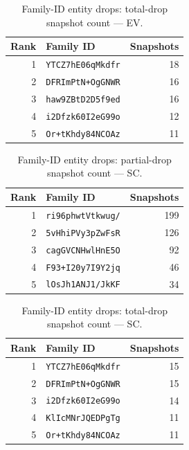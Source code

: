\documentclass[conference]{IEEEtran}
\begin{document}
\begin{table}[H]
\caption{Family-ID entity drops: total-drop snapshot count --- EV.}
\begin{center}\small
\begin{tabular}{|r|l|r|}
\hline
\textbf{Rank} & \textbf{Family ID} & \textbf{Snapshots} \\ \hline
1 & \texttt{YTCZ7hE06qMkdfr} & 18 \\ \hline
2 & \texttt{DFRImPtN+OgGNWR} & 16 \\ \hline
3 & \texttt{haw9ZBtD2D5f9ed} & 16 \\ \hline
4 & \texttt{i2Dfzk60I2eG99o} & 12 \\ \hline
5 & \texttt{Or+tKhdy84NCOAz} & 11 \\ \hline
\end{tabular}
\label{tab:famdrop_total_ephemeral_variable}
\end{center}\end{table}
 
\begin{table}[H]
\caption{Family-ID entity drops: partial-drop snapshot count --- SC.}
\begin{center}\small
\begin{tabular}{|r|l|r|}
\hline
\textbf{Rank} & \textbf{Family ID} & \textbf{Snapshots} \\ \hline
1 & \texttt{ri96phwtVtkwug/} & 199 \\ \hline
2 & \texttt{5vHhiPVy3pZwFsR} & 126 \\ \hline
3 & \texttt{cagGVCNHwlHnE5O} & 92 \\ \hline
4 & \texttt{F93+I20y7I9Y2jq} & 46 \\ \hline
5 & \texttt{lOsJh1ANJ1/JkKF} & 34 \\ \hline
\end{tabular}
\label{tab:famdrop_partial_static_control}
\end{center}\end{table}
 
\begin{table}[H]
\caption{Family-ID entity drops: total-drop snapshot count --- SC.}
\begin{center}\small
\begin{tabular}{|r|l|r|}
\hline
\textbf{Rank} & \textbf{Family ID} & \textbf{Snapshots} \\ \hline
1 & \texttt{YTCZ7hE06qMkdfr} & 15 \\ \hline
2 & \texttt{DFRImPtN+OgGNWR} & 15 \\ \hline
3 & \texttt{i2Dfzk60I2eG99o} & 14 \\ \hline
4 & \texttt{KlIcMNrJQEDPgTg} & 11 \\ \hline
5 & \texttt{Or+tKhdy84NCOAz} & 11 \\ \hline
\end{tabular}
\label{tab:famdrop_total_static_control}
\end{center}\end{table}
 
\end{document}

